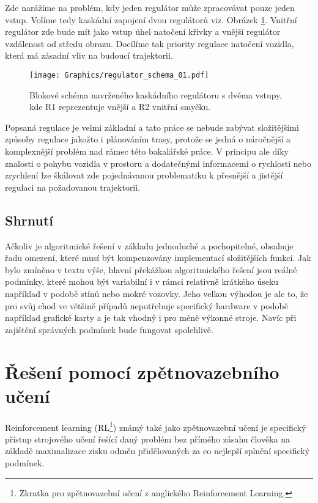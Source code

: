 \documentclass[czech, bc, kky, he, iso690numb]{fasthesis}
\begin{document}
                Zde narážíme na problém, kdy jeden regulátor může zpracovávat pouze jeden vstup. Volíme tedy kaskádní zapojení dvou regulátorů viz. Obrázek \ref{pic:regulator_schema}. Vnitřní regulátor zde bude mít jako vstup úhel natočení křivky a vnější regulátor vzdálenost od středu obrazu. Docílíme tak priority regulace natočení vozidla, která má zásadní vliv na budoucí trajektorii.
                
                	\begin{figure}[h]
                		\centering
                		\texttt{[image: Graphics/regulator\_schema\_01.pdf]}
                		\caption{Blokové schéma navrženého kaskádního regulátoru s dvěma vstupy, kde R1 reprezentuje vnější a R2 vnitřní smyčku.}
                		\label{pic:regulator_schema}
                	\end{figure}
                
                Popsaná regulace je velmi základní a tato práce se nebude zabývat složitějšími způsoby regulace jakožto i plánováním trasy, protože se jedná o náročnější a komplexnější problém nad rámec této bakalářské práce. V principu ale díky znalosti o pohybu vozidla v prostoru a dodatečnými informacemi o rychlosti nebo zrychlení lze škálovat zde pojednávanou problematiku k přesnější a jistější regulaci na požadovanou trajektorii.
                
                
            \subsection{Shrnutí}
            	Ačkoliv je algoritmické řešení v základu jednoduché a pochopitelné, obsahuje řadu omezení, které musí být kompenzovány implementací složitějších funkcí. Jak bylo zmíněno v textu výše, hlavní překážkou algoritmického řešení jsou reálné podmínky, které mohou být variabilní i v rámci relativně krátkého úseku například v podobě stínů nebo mokré vozovky. Jeho velkou výhodou je ale to, že pro svůj chod ve většině případů nepotřebuje specifický hardware v podobě například grafické karty a je tak vhodný i pro méně výkonné stroje. Navíc při zajištění správných podmínek bude fungovat spolehlivě.
            
        \section{Řešení pomocí zpětnovazebního učení}
            Reinforcement learning (RL\footnote{Zkratka pro zpětnovazební učení z anglického Reinforcement Learning.}) známý také jako zpětnovazební učení je specifický přístup strojového učení řešící daný problém bez přímého zásahu člověka na základě maximalizace zisku odměn přidělovaných za co nejlepší splnění specifický podmínek.
            
\end{document}
